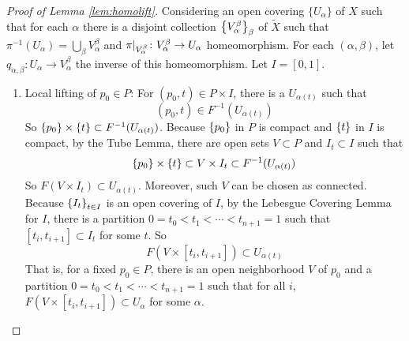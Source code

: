 \begin{enumerate}[label=\arabic{*}.]
	\begin{proof}[Proof of Lemma \ref{lem:homolift}]
		Considering an open covering $\{U_\alpha\}$ of $X$ such that for each $\alpha$ there is a disjoint collection $\left\{V_\alpha^\beta\right\}_\beta$ of $\widetilde{X}$ such that $\pi^{-1}(U_\alpha) = \bigcup_\beta V_\alpha^\beta$ and $\pi|_{V_\alpha^\beta} \colon V_\alpha^\beta \rightarrow U_\alpha$ homeomorphism. For each $(\alpha,\beta)$, let $q_{\alpha, \beta}: U_\alpha \rightarrow V_\alpha^\beta$ the inverse of this homeomorphism. Let $I = [0,1]$.
		\begin{enumerate}[label=\Roman*.]
			\item Local lifting of $p_0 \in P$: For $(p_0,t) \in P \times I$, there is a $U_{\alpha(t)}$ such that
			\begin{equation*}
				(p_0,t) \in F^{-1}(U_{\alpha(t)})
			\end{equation*}
			So $\left\{p_0\right\} \times \left\{t\right\} \subset F^{-1}(U_{\alpha(t)})$. Because $\left\{p_0\right\}$ in $P$ is compact and $\left\{t\right\}$ in $I$ is compact, by the Tube Lemma, there are open sets $V \subset P$ and $I_{t} \subset I$ such that
			\begin{equation*}
				\left\{p_0\right\} \times \left\{t\right\} \subset V \times I_{t} \subset  F^{-1}(U_{\alpha(t)})
			\end{equation*}
			So $F(V \times I_{t}) \subset U_{\alpha(t)}$. Moreover, such $V$ can be chosen as connected. Because $\left\{I_t\right\}_{t \in I}$ is an open covering of $I$, by the Lebesgue Covering Lemma for $I$, there is a partition $0=t_0 < t_1 < \cdots < t_{n+1}=1$ such that $[t_i,t_{i+1}] \subset I_t$ for some $t$. So
			\begin{equation*}
				F(V \times [t_i,t_{i+1}]) \subset U_{\alpha(t)}
			\end{equation*}
			That is, for a fixed $p_0 \in P$, there is an open neighborhood $V$ of $p_0$ and a partition $0=t_0 < t_1 < \cdots < t_{n+1}=1$ such that for all $i$, $F(V \times [t_i,t_{i+1}]) \subset U_{\alpha}$ for some $\alpha$.


\end{enumerate}
\end{proof}
\end{enumerate}
